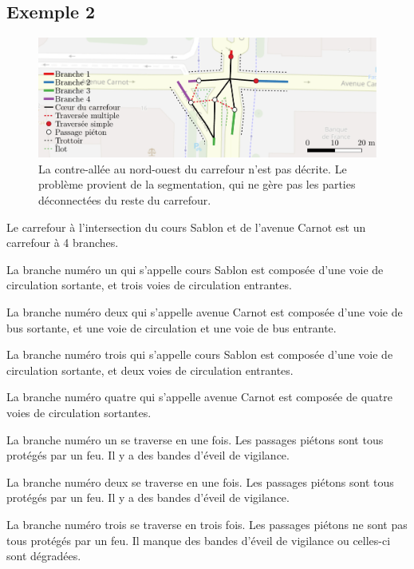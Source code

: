 \begin{appendix}
\newpage
\section*{Exemple 2}

\begin{figure}[ht]
  \centering
  \includegraphics[width=\textwidth]{images/annexes/carrefour_master.pdf}
  \caption{La contre-allée au nord-ouest du carrefour n'est pas décrite. Le problème provient de la segmentation, qui ne gère pas les parties déconnectées du reste du carrefour.}
  \label{fig:exemple2}
\end{figure}

Le carrefour à l'intersection du cours Sablon et de l'avenue Carnot est un carrefour à 4 branches.

\newpar{}

La branche numéro un qui s'appelle cours Sablon est composée d'une voie de circulation sortante, et trois voies de circulation entrantes.

La branche numéro deux qui s'appelle avenue Carnot est composée d'une voie de bus sortante, et une voie de circulation et une voie de bus entrante.

La branche numéro trois qui s'appelle cours Sablon est composée d'une voie de circulation sortante, et deux voies de circulation entrantes.

La branche numéro quatre qui s'appelle avenue Carnot est composée de quatre voies de circulation sortantes.

\newpar{}

La branche numéro un se traverse en une fois. Les passages piétons sont tous protégés par un feu. Il y a des bandes d'éveil de vigilance.

La branche numéro deux se traverse en une fois. Les passages piétons sont tous protégés par un feu. Il y a des bandes d'éveil de vigilance.

La branche numéro trois se traverse en trois fois. Les passages piétons ne sont pas tous protégés par un feu. Il manque des bandes d'éveil de vigilance ou celles-ci sont dégradées.


\end{appendix}
